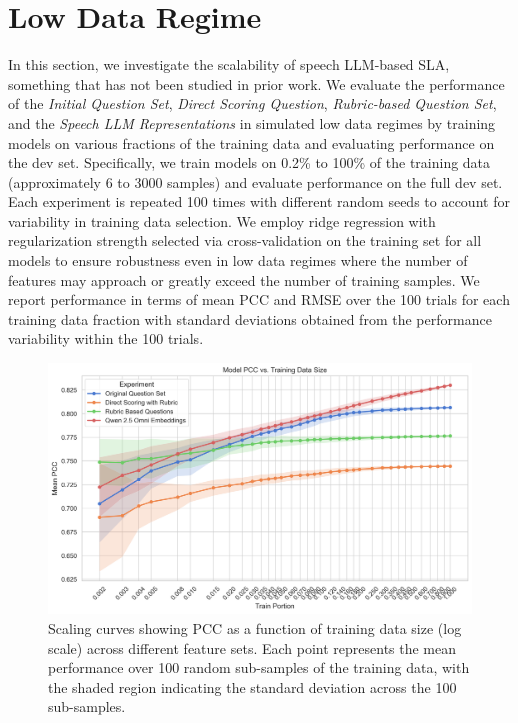 \documentclass{report}
\begin{document}
\section{Low Data Regime}
\label{sec:low_data_regime}
In this section, we investigate the scalability of speech LLM-based SLA, something that has not been studied in prior work. We evaluate the performance of the \emph{Initial Question Set}, \emph{Direct Scoring Question}, \emph{Rubric-based Question Set}, and the \emph{Speech LLM Representations} in simulated low data regimes by training models on various fractions of the training data and evaluating performance on the dev set. Specifically, we train models on 0.2\% to 100\% of the training data (approximately 6 to 3000 samples) and evaluate performance on the full dev set. Each experiment is repeated 100 times with different random seeds to account for variability in training data selection. We employ ridge regression with regularization strength selected via cross-validation on the training set for all models to ensure robustness even in low data regimes where the number of features may approach or greatly exceed the number of training samples. We report performance in terms of mean PCC and RMSE over the 100 trials for each training data fraction with standard deviations obtained from the performance variability within the 100 trials.

\begin{figure}[h]
  \centering
  \includegraphics[width=1\linewidth]{images/low_data_regime_pcc.png}
  \caption{Scaling curves showing PCC as a function of training data size (log scale) across different feature sets. Each point represents the mean performance over 100 random sub-samples of the training data, with the shaded region indicating the standard deviation across the 100 sub-samples.}
  \label{fig:low_data_regime_pcc}
\end{figure}
\end{document}
